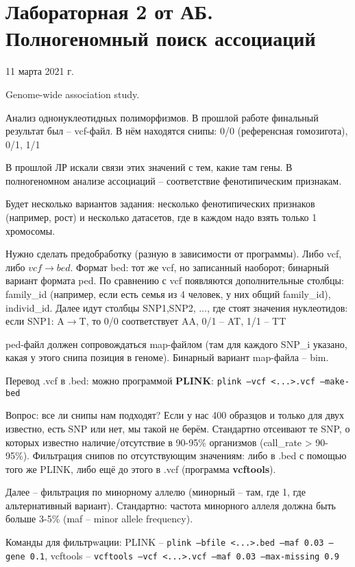 \documentclass[main.tex]{subfiles}
\begin{document}
\section{Лабораторная 2 от АБ. Полногеномный поиск ассоциаций}
11 марта 2021 г.

Genome-wide association study.

Анализ однонуклеотидных полиморфизмов.
В прошлой работе финальный результат был -- vcf-файл.
В нём находятся снипы: 0/0 (референсная гомозигота), 0/1, 1/1

В прошлой ЛР искали связи этих значений с тем, какие там гены.
В полногеномном анализе ассоциаций -- соответствие фенотипическим признакам.

Будет несколько вариантов задания: несколько фенотипических признаков (например, рост) и несколько датасетов, где в каждом надо взять только 1 хромосомы.

Нужно сделать предобработку (разную в зависимости от программы).
Либо vcf, либо $vcf \to bed$.
Формат bed: тот же vcf, но записанный наоборот; бинарный вариант формата ped.
По сравнению с vcf появляются дополнительные столбцы: family\_id (например, если есть семья из 4 человек, у них общий family\_id), individ\_id.
Далее идут столбцы SNP1,SNP2, ..., где стоят значения нуклеотидов: если SNP1: A$\to$T, то 0/0 соответствует AA, 0/1 -- AT, 1/1 -- TT

ped-файл должен сопровождаться map-файлом (там для каждого SNP\_i указано, какая у этого снипа позиция в геноме).
Бинарный вариант map-файла -- bim.

Перевод .vcf в .bed: можно программой \textbf{PLINK}: \texttt{plink --vcf <...>.vcf --make-bed}

Вопрос: все ли снипы нам подходят?
Если у нас 400 образцов и только для двух известно, есть SNP или нет, мы такой не берём.
Стандартно отсеивают те SNP, о которых известно наличие/отсутствие в 90-95\% организмов (call\_rate > 90-95\%).
Фильтрация снипов по отсутствующим значениям: либо в .bed с помощью того же PLINK, либо ещё до этого в .vcf (программа \textbf{vcftools}).

Далее -- фильтрация по минорному аллелю (минорный -- там, где 1, где альтернативный вариант).
Стандартно: частота минорного аллеля должна быть больше 3-5\% (maf -- minor allele frequency).

Команды для фильтрwации: PLINK -- \texttt{plink --bfile <...>.bed --maf 0.03 --gene 0.1}, vcftools -- \texttt{vcftools --vcf <...>.vcf --maf 0.03 --max-missing 0.9} \\
\end{document}
